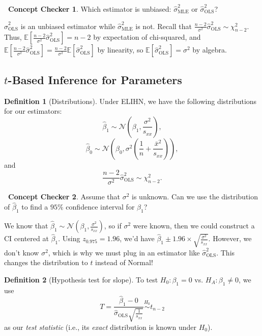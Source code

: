 \documentclass[12pt,oneside]{article}
\newcommand{\E}{\mathbb{E}}
\newcommand{\MLE}{\text{MLE}}
\newcommand{\OLS}{\text{OLS}}
\newcommand{\N}{\mathcal{N}}
\newcommand{\simnull}{\overset{H_0}{\sim}}
\theoremstyle{definition}
\newtheorem{definition}{Definition}
\newtheorem{concept}{\faPen \ Concept Checker}
\theoremstyle{remark}
\begin{document}
\begin{concept}
Which estimator is unbiased: $\hat{\sigma}^2_{\MLE}$ or $\hat{\sigma}^2_{\OLS}$?
\end{concept}

\begin{solutionbox}
$\hat{\sigma}^2_{\OLS}$ is an unbiased estimator while $\hat{\sigma}^2_{\MLE}$ is not. Recall that $\frac{n - 2}{\sigma^2} \hat{\sigma}^2_{\OLS} \sim \chi^{2}_{n - 2}$. Thus, $\E[\frac{n - 2}{\sigma^2} \hat{\sigma}^2_{\OLS}] = n - 2$ by expectation of chi-squared, and $\E[\frac{n - 2}{\sigma^2} \hat{\sigma}^2_{\OLS}] = \frac{n - 2}{\sigma^2} \E[\hat{\sigma}^2_{\OLS}]$ by linearity, so $\E[\hat{\sigma}^2_{\OLS}] = \sigma^2$ by algebra.
\end{solutionbox}

\subsection{$t$-Based Inference for Parameters}

\begin{definition}[Distributions]
Under ELIHN, we have the following distributions for our estimators: \[\hat{\beta}_{1} \sim \N \left( \beta_1, \frac{\sigma^2}{s_{xx}} \right),\] \[\hat{\beta}_{0} \sim \N \left( \beta_0, \sigma^2 \left( \frac{1}{n} + \frac{\bar{x}^2}{s_{xx}} \right) \right),\] and \[\frac{n - 2}{\sigma^2} \hat{\sigma}^2_{\OLS} \sim \chi^2_{n - 2}.\]
\end{definition}

\begin{concept}
Assume that $\sigma^2$ is unknown. Can we use the distribution of $\hat{\beta}_{1}$ to find a $95\%$ confidence interval for $\beta_{1}$?
\end{concept}

\begin{solutionbox}
We know that $\hat{\beta}_{1} \sim \N \left( \beta_1, \frac{\sigma^2}{s_{xx}} \right)$, so if $\sigma^2$ were known, then we could construct a CI centered at $\hat{\beta}_1$. Using $z_{0.975} = 1.96$, we'd have $\hat{\beta}_{1} \pm 1.96 \times \sqrt{\frac{\sigma^2}{s_{xx}}}$. However, we don't know $\sigma^2$, which is why we must plug in an estimator like $\hat{\sigma}^2_{\OLS}$. This changes the distribution to $t$ instead of Normal!
\end{solutionbox}

\begin{definition}[Hypothesis test for slope]
To test $H_0: \beta_1 = 0$ vs. $H_A: \beta_1 \neq 0$, we use \[T = \frac{\hat{\beta}_{1} - 0}{\hat{\sigma}_{\OLS} \sqrt{\frac{1}{s_{xx}}}} \simnull t_{n - 2}\] as our \textit{test statistic} (i.e., its \textit{exact} distribution is known under $H_0$).
\end{definition}
\end{document}
